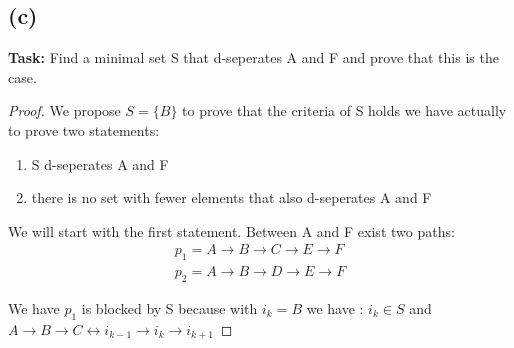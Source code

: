\documentclass{article}
\begin{document}
\subsection*{(c)}
\textbf{Task:} Find a minimal set S that d-seperates A and F and prove that this is the case.
\begin{proof}
    We propose $S= \{ B \}$ to prove that the criteria of S holds we have actually to prove two statements:
    \begin{enumerate}
        \item S d-seperates A and F
        \item there is no set with fewer elements that also d-seperates A and F
    \end{enumerate}
     
We will start with the first statement. Between A and F exist two paths:
\begin{align*}
    p_1 = A \rightarrow B \rightarrow C \rightarrow E \rightarrow F \\
    p_2 = A \rightarrow B \rightarrow D \rightarrow E \rightarrow F 
\end{align*}

We have $p_1$ is blocked by S because with $i_k = B$ we have : $i_k \in S$ and $A \rightarrow B \rightarrow C \leftrightarrow i_{k-1} \rightarrow i_k \rightarrow i_{k+1}$ 
\end{proof}



\end{document}
